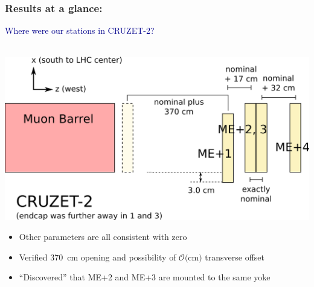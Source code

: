 \documentclass[compress]{beamer}
\begin{document}
\begin{frame}
\frametitle{Results at a glance:}
\hspace{-0.83 cm} \textcolor{darkblue}{\Large Where were our stations in CRUZET-2?}

\small

\vspace{0.6 cm}
\mbox{ } \hfill \includegraphics[width=0.9\linewidth]{where_things_are.png}

\vfill
\begin{itemize}\setlength{\itemsep}{0.1 cm}
\item Other parameters are all consistent with zero
\item Verified 370~cm opening and possibility of $\mathcal{O}($cm$)$ transverse offset
\item ``Discovered'' that ME+2 and ME+3 are mounted to the same yoke
\end{itemize}
\end{frame}
\end{document}
